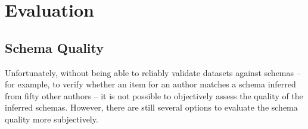 
\chapter{Evaluation}
\label{ch:Evaluation}


\section{Schema Quality}
\label{sec:Evaluation:quality}

Unfortunately, without being able to reliably validate datasets against schemas –
for example, to verify whether an item for an author matches a schema inferred from fifty other authors –
it is not possible to objectively assess the quality of the inferred schemas.
However, there are still several options to evaluate the schema quality more subjectively.


